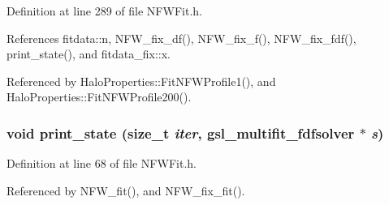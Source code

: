 Definition at line 289 of file NFWFit.h.



References fitdata::n, NFW\_\-fix\_\-df(), NFW\_\-fix\_\-f(), NFW\_\-fix\_\-fdf(), print\_\-state(), and fitdata\_\-fix::x.



Referenced by HaloProperties::FitNFWProfile1(), and HaloProperties::FitNFWProfile200().

\subsubsection[{print\_\-state}]{\setlength{\rightskip}{0pt plus 5cm}void print\_\-state (size\_\-t {\em iter}, \/  gsl\_\-multifit\_\-fdfsolver $\ast$ {\em s})}\label{NFWFit_8h_aecabecd9aa15722cb046d129e06cd8f1}


Definition at line 68 of file NFWFit.h.



Referenced by NFW\_\-fit(), and NFW\_\-fix\_\-fit().


